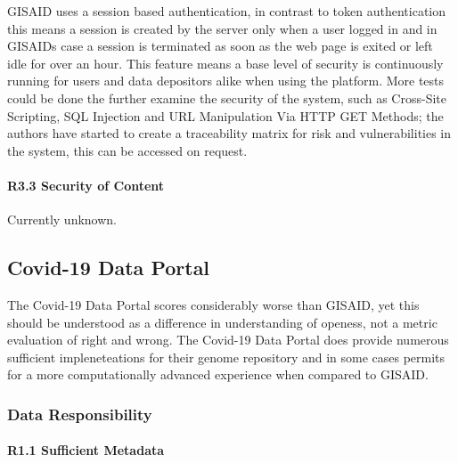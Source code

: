 \documentclass{article}
\begin{document}
GISAID uses a session based authentication, in contrast to token
authentication this means a session is created by the server only when a
user logged in and in GISAIDs case a session is terminated as soon as
the web page is exited or left idle for over an hour. This feature means
a base level of security is continuously running for users and data
depositors alike when using the platform. More tests could be done the
further examine the security of the system, such as Cross-Site
Scripting, SQL Injection and URL Manipulation Via HTTP GET Methods; the
authors have started to create a traceability matrix for risk and
vulnerabilities in the system, this can be accessed on request.

\hypertarget{r3.3-security-of-content}{%
\paragraph{R3.3 Security of Content}\label{r3.3-security-of-content}}

Currently unknown.

\hypertarget{covid-19-data-portal}{%
\subsection{Covid-19 Data Portal}\label{covid-19-data-portal}}

The Covid-19 Data Portal scores considerably worse than GISAID, yet this
should be understood as a difference in understanding of openess, not a
metric evaluation of right and wrong. The Covid-19 Data Portal does
provide numerous sufficient impleneteations for their genome repository
and in some cases permits for a more computationally advanced experience
when compared to GISAID.

\hypertarget{data-responsibility-2}{%
\subsubsection{Data Responsibility}\label{data-responsibility-2}}

\hypertarget{r1.1-sufficient-metadata-1}{%
\paragraph{R1.1 Sufficient Metadata}\label{r1.1-sufficient-metadata-1}}
\end{document}
